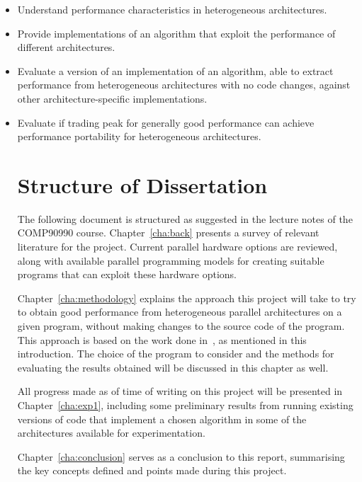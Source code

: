 \begin{itemize}
\item Understand performance characteristics in heterogeneous architectures.
\item Provide implementations of an algorithm that exploit the performance of different architectures.
\item Evaluate a version of an implementation of an algorithm, able to extract performance from heterogeneous architectures with no code changes, against other architecture-specific implementations.
\item Evaluate if trading peak for generally good performance can achieve performance portability for heterogeneous architectures.

\section{Structure of Dissertation}

The following document is structured as suggested in the lecture notes of the COMP90990 course. Chapter~\ref{cha:back} presents a survey of relevant literature for the project. Current parallel hardware options are reviewed, along with available parallel programming models for creating suitable programs that can exploit these hardware options.

Chapter~\ref{cha:methodology} explains the approach this project will take to try to obtain good performance from heterogeneous parallel architectures on a given program, without making changes to the source code of the program. This approach is based on the work done in~\cite{dolbeau2013one}, as mentioned in this introduction. The choice of the program to consider and the methods for evaluating the results obtained will be discussed in this chapter as well.

All progress made as of time of writing on this project will be presented in Chapter~\ref{cha:exp1}, including some preliminary results from running existing versions of code that implement a chosen algorithm in some of the architectures available for experimentation.

Chapter~\ref{cha:conclusion} serves as a conclusion to this report, summarising the key concepts defined and points made during this project.

\end{itemize}

